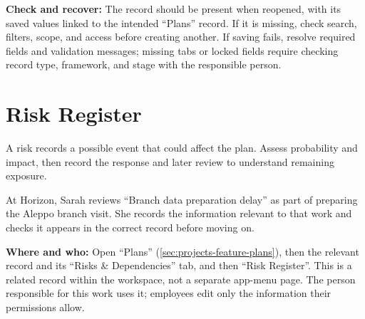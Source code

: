 \textbf{Check and recover:} The record should be present when reopened, with its saved values linked to the intended “Plans” record. If it is missing, check search, filters, scope, and access before creating another. If saving fails, resolve required fields and validation messages; missing tabs or locked fields require checking record type, framework, and stage with the responsible person.

\clearpage
\section{Risk Register}
\label{sec:projects-feature-planning-risks}

A risk records a possible event that could affect the plan. Assess probability and impact, then record the response and later review to understand remaining exposure.

\begin{rcnote}
At Horizon, Sarah reviews “Branch data preparation delay” as part of preparing the Aleppo branch visit. She records the information relevant to that work and checks it appears in the correct record before moving on.
\end{rcnote}

\textbf{Where and who:} Open “Plans” (\ref{sec:projects-feature-plans}), then the relevant record and its “Risks \& Dependencies” tab, and then “Risk Register”. This is a related record within the workspace, not a separate app-menu page. The person responsible for this work uses it; employees edit only the information their permissions allow.

